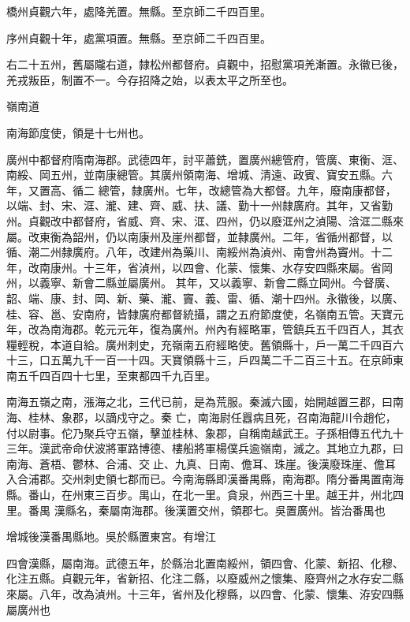 \begin{pinyinscope}
 橋州貞觀六年，處降羌置。無縣。至京師二千四百里。



 序州貞觀十年，處黨項置。無縣。至京師二千四百里。



 右二十五州，舊屬隴右道，隸松州都督府。貞觀中，招慰黨項羌漸置。永徽已後，羌戎叛臣，制置不一。今存招降之始，以表太平之所至也。



 嶺南道



 南海節度使，領是十七州也。



 廣州中都督府隋南海郡。武德四年，討平蕭銑，置廣州總管府，管廣、東衡、洭、南綏、岡五州，並南康總管。其廣州領南海、增城、清遠、政賓、寶安五縣。六年，又置高、循二
 總管，隸廣州。七年，改總管為大都督。九年，廢南康都督，以端、封、宋、洭、瀧、建、齊、威、扶、議、勤十一州隸廣府。其年，又省勤州。貞觀改中都督府，省威、齊、宋、洭、四州，仍以廢洭州之湞陽、浛洭二縣來屬。改東衡為韶州，仍以南康州及崖州都督，並隸廣州。二年，省循州都督，以循、潮二州隸廣府。八年，改建州為藥川、南綏州為湞州、南會州為竇州。十二年，改南康州。十三年，省湞州，以四會、化蒙、懷集、水存安四縣來屬。省岡州，以義寧、新會二縣並屬廣州。
 其年，又以義寧、新會二縣立岡州。今督廣、韶、端、康、封、岡、新、藥、瀧、竇、義、雷、循、潮十四州。永徽後，以廣、桂、容、邕、安南府，皆隸廣府都督統攝，謂之五府節度使，名嶺南五管。天寶元年，改為南海郡。乾元元年，復為廣州。州內有經略軍，管鎮兵五千四百人，其衣糧輕稅，本道自給。廣州刺史，充嶺南五府經略使。舊領縣十，戶一萬二千四百六十三，口五萬九千一百一十四。天寶領縣十三，戶四萬二千二百三十五。在京師東南五千四百四十七里，至東都四千九百里。



 南海五嶺之南，漲海之北，三代已前，是為荒服。秦滅六國，始開越置三郡，曰南海、桂林、象郡，以謫戍守之。秦
 亡，南海尉任囂病且死，召南海龍川令趙佗，付以尉事。佗乃聚兵守五嶺，擊並桂林、象郡，自稱南越武王。子孫相傳五代九十三年。漢武帝命伏波將軍路博德、樓船將軍楊僕兵逾嶺南，滅之。其地立九郡，曰南海、蒼梧、鬱林、合浦、交止、九真、日南、儋耳、珠崖。後漢廢珠崖、儋耳入合浦郡。交州刺史領七郡而已。今南海縣即漢番禺縣，南海郡。隋分番禺置南海縣。番山，在州東三百步。禺山，在北一里。貪泉，州西三十里。越王井，州北四里。番禺
 漢縣名，秦屬南海郡。後漢置交州，領郡七。吳置廣州。皆治番禺也



 增城後漢番禺縣地。吳於縣置東宮。有增江



 四會漢縣，屬南海。武德五年，於縣治北置南綏州，領四會、化蒙、新招、化穆、化注五縣。貞觀元年，省新招、化注二縣，以廢威州之懷集、廢齊州之水存安二縣來屬。八年，改為湞州。十三年，省州及化穆縣，以四會、化蒙、懷集、洊安四縣屬廣州也




\end{pinyinscope}
